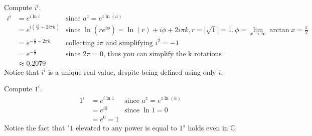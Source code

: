   Compute $i^i$.
  \begin{align*}
    i^i & = e^{i\ln i}
        & \text{since } a^z = e^{z\ln(a)} \\
        & = e^{i\left(\frac{i\pi}{2} + 2i\pi k\right)}
        & \text{since } \ln(re^{i\phi}) = \ln(r) + i\phi + 2i\pi k, 
                        r = |\sqrt1| = 1, 
                        \phi = \lim_{x \to \infty}\arctan{x} = \frac{\pi}{2} \\
        & = e^{-\frac{\pi}{2}-2\pi k}
        & \text{collecting } i\pi \text{ and simplifying } i^2 = -1 \\
        & = e^{-\frac{\pi}{2}}
        & \text{since } 2\pi = 0 \text{, thus you can simplify the k rotations} \\
        & \approx 0.2079
  \end{align*}
  Notice that $i^i$ is a unique real value, despite being defined using only $i$.

  Compute $1^i$.
  \begin{align*}
    1^i & = e^{i\ln 1}
        & \text{since } a^z = e^{z\ln(a)} \\
        & = e^{i0}
        & \text{since } \ln1 = 0 \\
        & = e^{0} = 1
  \end{align*}
  Notice the fact that "$1$ elevated to any power is equal to $1$" holds even in $\mathbb{C}$.
